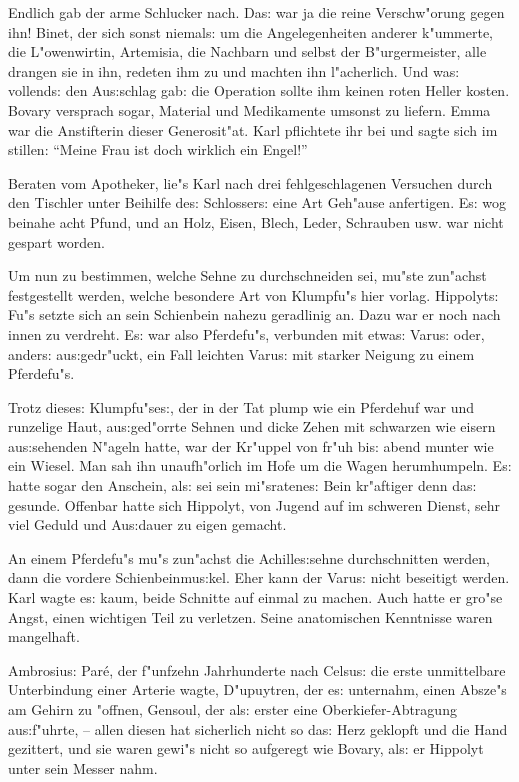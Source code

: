 \documentclass[oneside,12pt]{book}
\newcommand{\s}{s:}%
\begin{document}
Endlich gab der arme Schlucker nach. Da{\s} war ja die reine
Verschw"orung gegen ihn! Binet, der sich sonst niemal{\s} um die
Angelegenheiten anderer k"ummerte, die L"owenwirtin, Artemisia,
die Nachbarn und selbst der B"urgermeister, alle drangen sie in
ihn, redeten ihm zu und machten ihn l"acherlich. Und wa{\s}
vollend{\s} den Au{\s}schlag gab: die Operation sollte ihm keinen
roten Heller kosten. Bovary versprach sogar, Material und
Medikamente umsonst zu liefern. Emma war die Anstifterin dieser
Generosit"at. Karl pflichtete ihr bei und sagte sich im stillen:
"`Meine Frau ist doch wirklich ein Engel!"'

Beraten vom Apotheker, lie"s Karl nach drei fehlgeschlagenen
Versuchen durch den Tischler unter Beihilfe de{\s} Schlosser{\s}
eine Art Geh"ause anfertigen. E{\s} wog beinahe acht Pfund, und an
Holz, Eisen, Blech, Leder, Schrauben usw. war nicht gespart
worden.

Um nun zu bestimmen, welche Sehne zu durchschneiden sei, mu"ste
zu\-n"achst festgestellt werden, welche besondere Art von Klumpfu"s
hier vorlag. Hippolyt{\s} Fu"s setzte sich an sein Schienbein
nahezu geradlinig an. Dazu war er noch nach innen zu verdreht.
E{\s} war also Pferdefu"s, verbunden mit etwa{\s} Varu{\s} oder,
ander{\s} au{\s}gedr"uckt, ein Fall leichten Varu{\s} mit starker
Neigung zu einem Pferdefu"s.

Trotz diese{\s} Klumpfu"se{\s}, der in der Tat plump wie ein
Pferdehuf war und runzelige Haut, au{\s}ged"orrte Sehnen und dicke
Zehen mit schwarzen wie eisern au{\s}sehenden N"ageln hatte, war
der Kr"uppel von fr"uh bi{\s} abend munter wie ein Wiesel. Man sah
ihn unaufh"orlich im Hofe um die Wagen herumhumpeln. E{\s} hatte
sogar den Anschein, al{\s} sei sein mi"sratene{\s} Bein kr"aftiger
denn da{\s} gesunde. Offenbar hatte sich Hippolyt, von Jugend auf
im schweren Dienst, sehr viel Geduld und Au{\s}dauer zu eigen
gemacht.

An einem Pferdefu"s mu"s zun"achst die Achille{\s}sehne
durchschnitten werden, dann die vordere Schienbeinmu{\s}kel. Eher
kann der Varu{\s} nicht beseitigt werden. Karl wagte e{\s} kaum,
beide Schnitte auf einmal zu machen. Auch hatte er gro"se Angst,
einen wichtigen Teil zu verletzen. Seine anatomischen Kenntnisse
waren mangelhaft.

Ambrosiu{\s} Par\'e, der f"unfzehn Jahrhunderte nach Celsu{\s} die
erste unmittelbare Unterbindung einer Arterie wagte, D"upuytren,
der e{\s} unternahm, einen Abs\/ze"s am Gehirn zu "offnen,
Gensoul, der al{\s} erster eine Oberkiefer-Abtragung
au{\s}f"uhrte, -- allen diesen hat sicherlich nicht so da{\s} Herz
geklopft und die Hand gezittert, und sie waren gewi"s nicht so
aufgeregt wie Bovary, al{\s} er Hippolyt unter sein Messer nahm.
\end{document}
